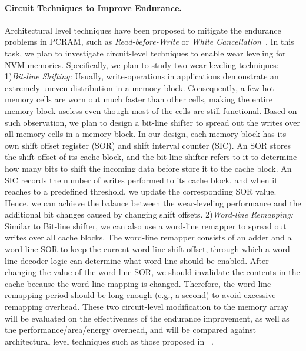 \paragraph{Circuit Techniques to Improve Endurance.} Architectural level techniques have been proposed to mitigate the endurance problems in PCRAM, such as \textit{Read-before-Write} or \textit{White Cancellation}~\cite{PRAM:Microsoft,PRAM:IBM}. In this task, we plan to investigate circuit-level techniques to enable wear leveling for NVM memories. Specifically, we plan to study
two wear leveling techniques: 1)\textit{Bit-line Shifting:} Usually, write-operations in applications demonstrate an extremely uneven distribution in a memory block. Consequently, a few hot memory cells are worn out much faster than other cells, making the entire memory block useless even though most of the cells are still functional. Based on such observation, we plan to design a bit-line shifter to spread out the writes over all memory cells in a memory block. In our design, each memory block has its own shift offset register (SOR) and shift interval counter (SIC). An SOR stores the shift offset of its cache block, and the bit-line shifter refers
to it to determine how many bits to shift the incoming data before store it to the cache block. An SIC records the number of writes performed to its cache block, and when it reaches to a predefined threshold, we update the corresponding SOR
value.  Hence, we can achieve
the balance between the wear-leveling performance and the
additional bit changes caused by changing shift offsets. 2)\textit{Word-line Remapping:} Similar to Bit-line shifter, we can also 
use a word-line remapper to spread out writes over all cache
blocks. The word-line remapper consists of an adder and a
word-line SOR to keep the current word-line shift offset,
through which a word-line decoder logic can determine what
word-line should be enabled.   After changing the value of the word-line SOR, we should
invalidate the contents in the cache because the word-line mapping
is changed. Therefore, the word-line remapping period
should be long enough (e.g., a second) to avoid excessive
remapping overhead. These two circuit-level modification to the memory array will be evaluated on the effectiveness of the endurance improvement, as well as the performance/area/energy overhead, and will be compared against architectural level techniques such as those proposed in  ~\cite{PRAM:Microsoft,PRAM:IBM}.



